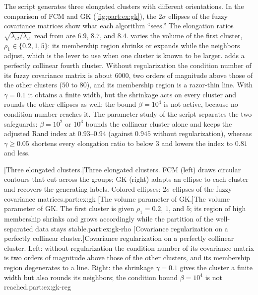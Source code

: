 The script  generates three elongated clusters with different orientations. In the comparison of FCM and GK (\cref{fig:part:ex:gk}), the $2\sigma$ ellipses of the fuzzy covariance matrices show what each algorithm ``sees.'' The elongation ratios $\sqrt{\lambda_{i2}/\lambda_{i1}}$ read from  are $6.9$, $8.7$, and $8.4$.  varies the volume of the first cluster, $\rho_1\in\{0.2,1,5\}$: its membership region shrinks or expands while the neighbors adjust, which is the lever to use when one cluster is known to be larger.  adds a perfectly collinear fourth cluster. Without regularization the condition number of its fuzzy covariance matrix is about $6000$, two orders of magnitude above those of the other clusters ($50$ to $80$), and its membership region is a razor-thin line. With $\gamma=0.1$ it obtains a finite width, but the shrinkage acts on every cluster and rounds the other ellipses as well; the bound $\beta=10^4$ is not active, because no condition number reaches it. The parameter study of the script separates the two safeguards: $\beta=10^2$ or $10^3$ bounds the collinear cluster alone and keeps the adjusted Rand index at $0.93$--$0.94$ (against $0.945$ without regularization), whereas $\gamma\ge0.05$ shortens every elongation ratio to below $3$ and lowers the index to $0.81$ and less.

[Three elongated clusters.]{Three elongated clusters. FCM (left) draws circular contours that cut across the groups; GK (right) adapts an ellipse to each cluster and recovers the generating labels. Colored ellipses: $2\sigma$ ellipses of the fuzzy covariance matrices.}{part:ex:gk}
[The volume parameter of GK.]{The volume parameter of GK. The first cluster is given $\rho_1=0.2$, $1$, and $5$; its region of high membership shrinks and grows accordingly while the partition of the well-separated data stays stable.}{part:ex:gk-rho}
[Covariance regularization on a perfectly collinear cluster.]{Covariance regularization on a perfectly collinear cluster. Left: without regularization the condition number of its covariance matrix is two orders of magnitude above those of the other clusters, and its membership region degenerates to a line. Right: the shrinkage $\gamma=0.1$ gives the cluster a finite width but also rounds its neighbors; the condition bound $\beta=10^4$ is not reached.}{part:ex:gk-reg}

